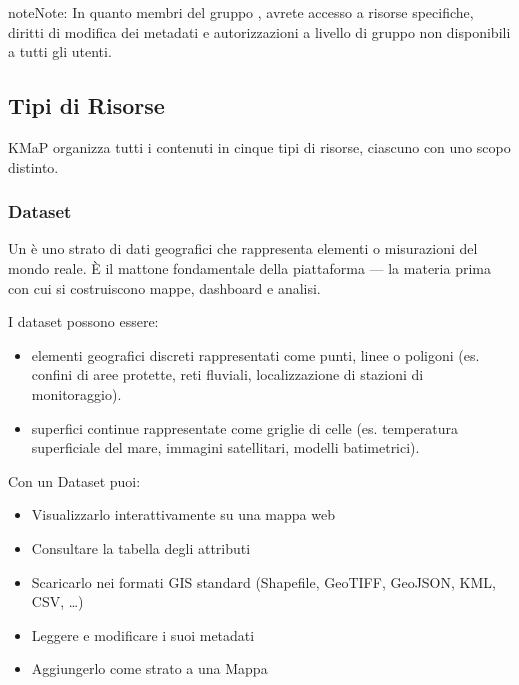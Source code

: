 \documentclass[letterpaper,10pt,english]{sphinxmanual}
\begin{document}
\begin{sphinxadmonition}{note}{Note:}
\sphinxAtStartPar
In quanto membri del gruppo , avrete accesso a risorse specifiche,
diritti di modifica dei metadati e autorizzazioni a livello di gruppo non disponibili
a tutti gli utenti.
\end{sphinxadmonition}


\subsection{Tipi di Risorse}
\label{\detokenize{it/01_benvenuto:tipi-di-risorse}}
\sphinxAtStartPar
KMaP organizza tutti i contenuti in cinque tipi di risorse, ciascuno con uno scopo distinto.


\subsubsection{Dataset}
\label{\detokenize{it/01_benvenuto:dataset}}
\sphinxAtStartPar
Un  è uno strato di dati geografici che rappresenta elementi o misurazioni
del mondo reale. È il mattone fondamentale della piattaforma — la materia prima con cui
si costruiscono mappe, dashboard e analisi.

\sphinxAtStartPar
I dataset possono essere:
\begin{itemize}
\item {} 
\sphinxAtStartPar
{} \textendash{} elementi geografici discreti rappresentati come punti, linee o poligoni
(es. confini di aree protette, reti fluviali, localizzazione di stazioni di monitoraggio).

\item {} 
\sphinxAtStartPar
{} \textendash{} superfici continue rappresentate come griglie di celle
(es. temperatura superficiale del mare, immagini satellitari, modelli batimetrici).

\end{itemize}

\sphinxAtStartPar
Con un Dataset puoi:
\begin{itemize}
\item {} 
\sphinxAtStartPar
Visualizzarlo interattivamente su una mappa web

\item {} 
\sphinxAtStartPar
Consultare la tabella degli attributi

\item {} 
\sphinxAtStartPar
Scaricarlo nei formati GIS standard (Shapefile, GeoTIFF, GeoJSON, KML, CSV, …)

\item {} 
\sphinxAtStartPar
Leggere e modificare i suoi metadati

\item {} 
\sphinxAtStartPar
Aggiungerlo come strato a una Mappa

\end{itemize}
\end{document}
